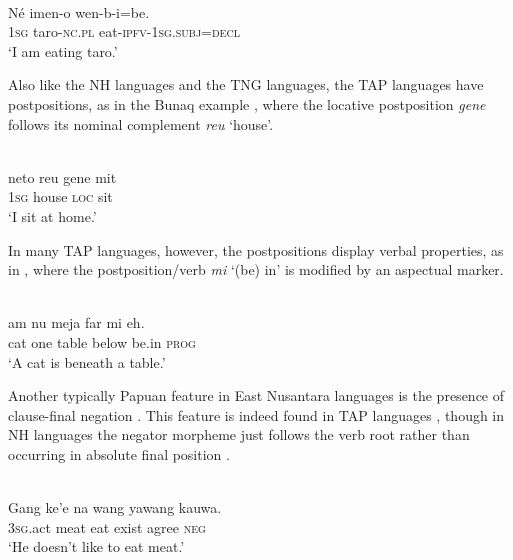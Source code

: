 \ea%
\label{ex:4:27}
 \\
\gll  N\'e imen-o wen-b-i=be. \\
 \textsc{1sg} taro-\textsc{nc.pl} eat-\textsc{ipfv-1sg.subj=decl}  \\
\glt `I am eating taro.'
\z





Also like the NH languages and the TNG languages, the TAP languages have postpositions, as in the Bunaq example , where the locative postposition \textit{gene} follows its nominal complement \textit{reu} `house'.





 
\ea%
\label{ex:4:28}
 \\
\gll   neto  reu  gene  mit\\ 
\textsc{1sg}  house  \textsc{loc}  sit\\  
\glt `I sit at home.'  \\

\z
 




In many TAP languages, however, the postpositions display verbal properties, as in , where the postposition/verb \textit{mi} `(be) in' is modified by an aspectual marker.


\ea%
\label{ex:4:29}
 \\
\gll  {\textglotstop}am{\textopeno} nu meja far mi eh. \\
   cat one table below be.in \textsc{prog} \\
\glt `A cat is beneath a table.'
\z





Another typically Papuan feature in East Nusantara languages is the presence of clause-final negation \citep{KlamerEtAl2008}. This feature is indeed found in TAP languages , though in NH languages the negator morpheme just follows the verb root rather than occurring in absolute final position .


\ea%
\label{ex:4:30}
 \\
\gll  Gang ke'e na wang yawang kauwa. \\
  \textsc{3sg}.act meat eat exist agree \textsc{neg} \\
\glt `He doesn't like to eat meat.'
\z






